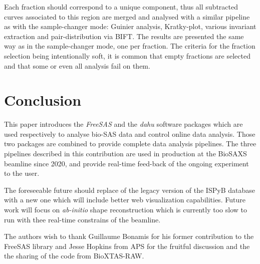 \documentclass[preprint]{iucr}              %
\begin{document}
Each fraction should correspond to a unique component, thus all subtracted curves associated to this region are merged and analysed with a similar pipeline as with the sample-changer mode: Guinier analysis, Kratky-plot, various invariant extraction and pair-distribution via BIFT. 
The results are presented the same way as in the sample-changer mode, one per fraction.
The criteria for the fraction selection being intentionally soft, it is common that empty fractions are selected and that some or even all analysis fail on them. 


\section{Conclusion}

This paper introduces the \textit{FreeSAS} and the \textit{dahu} software packages which are used respectively to analyse bio-SAS data and control online data analysis. 
Those two packages are combined to provide complete data analysis pipelines.
The three pipelines described in this contribution are used in production at the BioSAXS beamline 
since 2020, and provide real-time feed-back of the ongoing experiment to the user.

The foreseeable future should replace of the legacy version of the ISPyB database with a new one which will include better web visualization capabilities.
Future work will focus on \textit{ab-initio} shape reconstruction which is currently too slow to run with thee real-time constrains of the beamline.


The authors wish to thank Guillaume Bonamis for his former contribution to the FreeSAS library and Jesse Hopkins from APS for the fruitful discussion and the the sharing of the code from BioXTAS-RAW.





\end{document}
